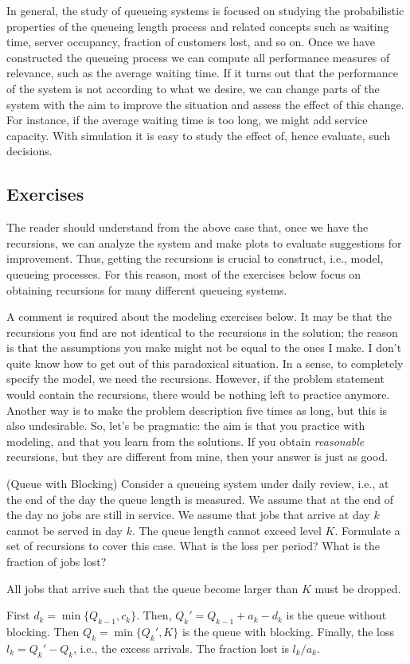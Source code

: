 In general, the study of queueing systems is focused on
studying the probabilistic properties of the queueing length process
and related concepts such as waiting time, server occupancy, fraction
of customers lost, and so on. Once we have constructed the queueing
process we can compute all performance measures of relevance, such as
the average waiting time. If it turns out that the
performance of the system is not according to what we desire, we can
change parts of the system with the aim to improve the situation and
assess the effect of this change.  For instance, if the average
waiting time is too long, we might add service capacity. With simulation it is easy to study the effect of, hence
evaluate, such decisions.

\subsection*{Exercises}
\label{sec:exercises-1}


The reader should understand from the above case that, once we have
the recursions, we can analyze the system and make plots to evaluate
suggestions for improvement.  Thus, getting the recursions is crucial
to construct, i.e., model, queueing processes. For this reason, most
of the exercises below focus on obtaining recursions for many
different queueing systems. 

A comment is required about the modeling exercises below. It may be
that the recursions you find are not identical to the recursions in
the solution; the reason is that the assumptions you make might not be
equal to the ones I make. I don't quite know how to get out of this
paradoxical situation.  In a sense, to completely specify the model,
we need the recursions. However, if the problem statement would
contain the recursions, there would be nothing left to practice
anymore. Another way is to make the problem description five times as
long, but this is also undesirable. So, let's be pragmatic: the aim is
that you practice with modeling, and that you learn from the
solutions.  If you obtain \emph{reasonable} recursions, but they are
different from mine, then your answer is just as good.

\begin{exercise} (Queue with Blocking) Consider a queueing system
  under daily review, i.e., at the end of the day the queue length is
  measured. We assume that at the end of the day no jobs are still in
  service. We assume that jobs that arrive at day $k$ cannot be served
  in day $k$. The queue length cannot exceed level $K$.  Formulate a
  set of recursions to cover this case. What is the loss per period? What is the fraction of jobs lost?
  \begin{solution}

    All jobs that arrive such that the queue become larger than $K$
    must be dropped. 

First $d_k = \min\{Q_{k-1}, c_k\}$. Then, $Q_k' = Q_{k-1}+a_k-d_k$ is the queue without blocking. Then $Q_k=\min\{Q_k', K\}$ is the queue with blocking. Finally, the loss $l_k=Q_k'-Q_k$, i.e., the excess arrivals. The fraction lost is $l_k/a_k$. 
  \end{solution}
\end{exercise}

